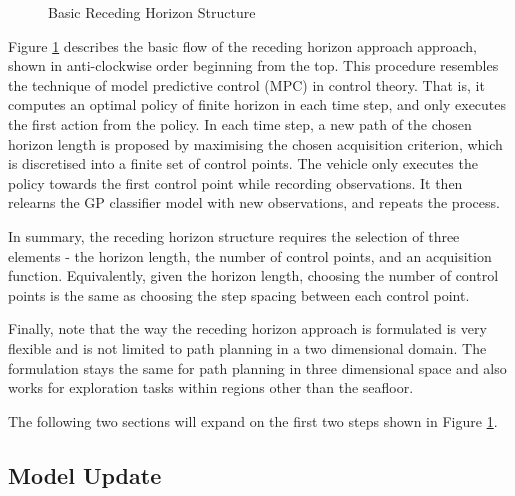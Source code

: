 			\begin{figure}[!htbp]
				\begin{center}
				\end{center}
			\caption{Basic Receding Horizon Structure}
			\label{Figure:RecedingHorizonMethodOutline}
			\end{figure}
					
			Figure \ref{Figure:RecedingHorizonMethodOutline} describes the basic flow of the receding horizon approach approach, shown in anti-clockwise order beginning from the top. This procedure resembles the technique of model predictive control (MPC) in control theory. That is, it computes an optimal policy of finite horizon in each time step, and only executes the first action from the policy. In each time step, a new path of the chosen horizon length is proposed by maximising the chosen acquisition criterion, which is discretised into a finite set of control points. The vehicle only executes the policy towards the first control point while recording observations. It then relearns the GP classifier model with new observations, and repeats the process.
	
			In summary, the receding horizon structure requires the selection of three elements - the horizon length, the number of control points, and an acquisition function. Equivalently, given the horizon length, choosing the number of control points is the same as choosing the step spacing between each control point. 
			
			Finally, note that the way the receding horizon approach is formulated is very flexible and is not limited to path planning in a two dimensional domain. The formulation stays the same for path planning in three dimensional space and also works for exploration tasks within regions other than the seafloor.
			
			The following two sections will expand on the first two steps shown in Figure \ref{Figure:RecedingHorizonMethodOutline}.
	
		\subsection{Model Update}
		\label{InformativeSeafloorExploration:RecedingHorizonFormulation:ModelUpdate}
				
